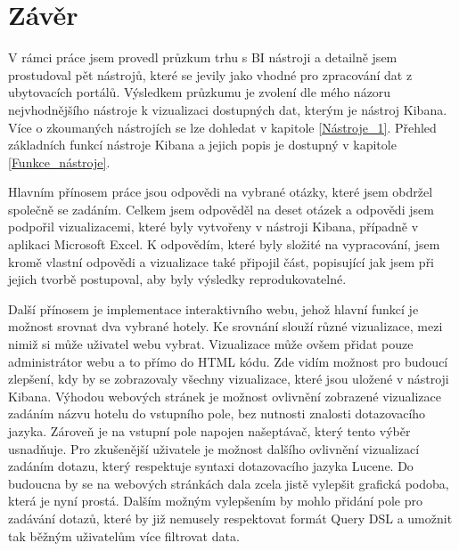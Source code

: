 \documentclass[czech,BP]{thesiskiv}
\begin{document}
\chapter{Závěr}
\label{závěr}
V rámci práce jsem provedl průzkum trhu s BI nástroji a detailně jsem prostudoval pět nástrojů, které se jevily jako vhodné pro zpracování dat z ubytovacích portálů. Výsledkem průzkumu je zvolení dle mého názoru nejvhodnějšího nástroje k vizualizaci dostupných dat, kterým je nástroj Kibana. Více o zkoumaných nástrojích se lze dohledat v kapitole \ref{Nástroje_1}. Přehled základních funkcí nástroje Kibana a jejich popis je dostupný v kapitole \ref{Funkce_nástroje}.


Hlavním přínosem práce jsou odpovědi na vybrané otázky, které jsem obdržel společně se zadáním. Celkem jsem odpověděl na deset otázek a odpovědi jsem podpořil vizualizacemi, které byly vytvořeny v nástroji Kibana, případně v aplikaci Microsoft Excel. K odpovědím, které byly složité na vypracování, jsem kromě vlastní odpovědi a vizualizace také připojil část, popisující jak jsem při jejich tvorbě postupoval, aby byly výsledky reprodukovatelné. 


Další přínosem je implementace interaktivního webu, jehož hlavní funkcí je možnost srovnat dva vybrané hotely. Ke srovnání slouží různé vizualizace, mezi nimiž si může uživatel webu vybrat. Vizualizace může ovšem přidat pouze administrátor  webu a to přímo do HTML kódu. Zde vidím možnost pro budoucí zlepšení, kdy by se zobrazovaly všechny vizualizace, které jsou uložené v nástroji Kibana. Výhodou webových stránek je možnost ovlivnění zobrazené vizualizace zadáním názvu hotelu do vstupního pole, bez nutnosti znalosti  dotazovacího jazyka. Zároveň je na vstupní pole napojen našeptávač, který tento výběr usnadňuje. Pro  zkušenější uživatele je možnost dalšího ovlivnění vizualizací zadáním dotazu, který respektuje syntaxi dotazovacího jazyka Lucene. Do budoucna by se na webových stránkách dala zcela jistě vylepšit grafická podoba, která je nyní prostá. Dalším možným vylepšením by mohlo přidání pole pro zadávání dotazů, které by již nemusely respektovat formát Query DSL a umožnit tak běžným uživatelům více filtrovat data.
\end{document}
